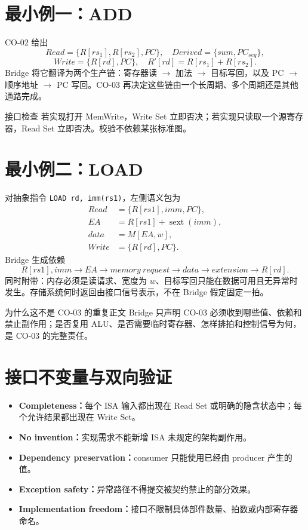 \documentclass[UTF8,fontset=fandol,11pt,a4paper]{ctexart}
\newcommand{\kw}[1]{\textbf{\color{deep}#1}}
\newcommand{\code}[1]{\texttt{#1}}
\begin{document}
\section{最小例一：ADD}

CO-02 给出
\[
Read=\{R[rs_1],R[rs_2],PC\},\quad
Derived=\{sum,PC_{seq}\},
\]
\[
Write=\{R[rd],PC\},\quad
R'[rd]=R[rs_1]+R[rs_2].
\]
Bridge 将它翻译为两个生产链：寄存器读 $\to$ 加法 $\to$ 目标写回，以及 PC $\to$ 顺序地址 $\to$ PC 写回。CO-03 再决定这些链由一个长周期、多个周期还是其他通路完成。

\begin{warnbox}{接口检查}
若实现打开 MemWrite，Write Set 立即否决；若实现只读取一个源寄存器，Read Set 立即否决。校验不依赖某张标准图。
\end{warnbox}

\section{最小例二：LOAD}

对抽象指令 \code{LOAD rd, imm(rs1)}，左侧语义包为
\[
\begin{aligned}
Read&=\{R[rs1],imm,PC\},\\
EA&=R[rs1]+\operatorname{sext}(imm),\\
data&=M[EA,w],\\
Write&=\{R[rd],PC\}.
\end{aligned}
\]
Bridge 生成依赖
\[
R[rs1],imm\to EA\to memory\ request\to data\to extension\to R[rd].
\]
同时附带：内存必须是读请求、宽度为 $w$、目标写回只能在数据可用且无异常时发生。存储系统何时返回由接口信号表示，不在 Bridge 假定固定一拍。

\begin{examplebox}{为什么这不是 CO-03 的重复正文}
Bridge 只声明 CO-03 必须收到哪些值、依赖和禁止副作用；是否复用 ALU、是否需要临时寄存器、怎样排拍和控制信号为何，是 CO-03 的完整责任。
\end{examplebox}

\section{接口不变量与双向验证}

\begin{itemize}
  \item \kw{Completeness：}每个 ISA 输入都出现在 Read Set 或明确的隐含状态中；每个允许结果都出现在 Write Set。
  \item \kw{No invention：}实现需求不能新增 ISA 未规定的架构副作用。
  \item \kw{Dependency preservation：}consumer 只能使用已经由 producer 产生的值。
  \item \kw{Exception safety：}异常路径不得提交被契约禁止的部分效果。
  \item \kw{Implementation freedom：}接口不限制具体部件数量、拍数或内部寄存器命名。
\end{itemize}
\end{document}
